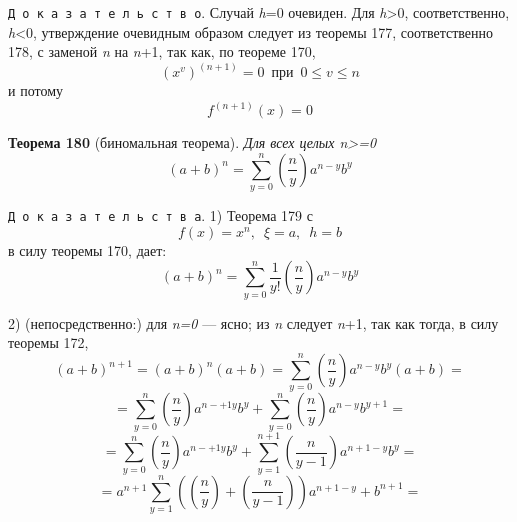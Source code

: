 \texttt{Д\,о\,к\,а\,з\,а\,т\,е\,л\,ь\,с\,т\,в\,о}. Случай \textit{h}=0 очевиден. Для \textsl{h}>0, соответственно, \textit{h}<0, утверждение очевидным образом следует из теоремы 177, соответственно 178, с заменой \textit{n} на \textit{n}+1, так как, по теореме 170, 
\[
(x^\mathit{v})^{(n+1)}=0\,\,\,при\,\,\,0\leqslant \mathit{v} \leqslant n
\]
и потому
\[
\mathit{f}^{(n+1)}(x)=0
\]

\textbf{Теорема 180} (биномальная теорема). \textit{Для всех целых n>=0}
\[
(a+b)^n=\sum\limits^{n}_{\mathit{y}=0} {(\frac{n}{\mathit{y}})a^{n-\mathit{y}}b^\mathit{y}}
\]

\texttt{Д\,о\,к\,а\,з\,а\,т\,е\,л\,ь\,с\,т\,в\,а}. 1) Теорема 179 с
\[
\mathit{f}(x)=x^n,\,\,\,\xi=a,\,\,\,h=b
\]
в силу теоремы 170, дает:
\[
(a+b)^n=\sum\limits^{n}_{\mathit{y}=0} {\frac{1}{\mathit{y}!}(\frac{n}{\mathit{y}})a^{n-\mathit{y}}b^\mathit{y}}
\]

2) (непосредственно:) для \textit{n=0} --- ясно;  из \textit{n} следует \textit{n}+1, так как тогда, в силу теоремы 172,
\[
(a+b)^{n+1}=(a+b)^n(a+b)=\sum\limits^{n}_{\mathit{y}=0} {(\frac{n}{\mathit{y}})a^{n-\mathit{y}}b^\mathit{y}}(a+b)=
\]\[=\sum\limits^{n}_{\mathit{y}=0} {(\frac{n}{\mathit{y}})a^{n-+1\mathit{y}}b^\mathit{y}}+\sum\limits^{n}_{\mathit{y}=0} {(\frac{n}{\mathit{y}})a^{n-\mathit{y}}b^{\mathit{y}+1}}=
\]\[=\sum\limits^{n}_{\mathit{y}=0} {(\frac{n}{\mathit{y}})a^{n-+1\mathit{y}}b^\mathit{y}}+\sum\limits^{n+1}_{\mathit{y}=1} {(\frac{n}{\mathit{y}-1})a^{n+1-\mathit{y}}b^{\mathit{y}}}=
\]\[=a^{n+1}\sum\limits^{n}_{\mathit{y}=1}{((\frac{n}{\mathit{y}})+(\frac{n}{\mathit{y}-1}))a^{n+1-\mathit{y}}+b^{n+1}}=
\]